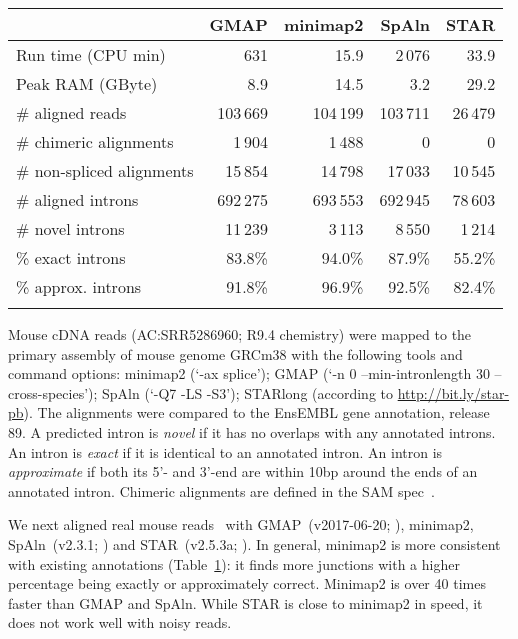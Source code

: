 \documentclass{bioinfo}
\begin{document}
\begin{table}[!tb]
{\footnotesize\label{tab:intron}
\begin{tabular}{p{3.1cm}rrrr}
\toprule
& GMAP & minimap2 & SpAln & STAR\\
\midrule
Run time (CPU min)        & 631      & 15.9     & 2\,076   & 33.9 \\
Peak RAM (GByte)          & 8.9      & 14.5     & 3.2      & 29.2\vspace{1em}\\
\# aligned reads          & 103\,669 & 104\,199 & 103\,711 & 26\,479 \\
\# chimeric alignments    & 1\,904   & 1\,488   & 0        & 0 \\
\# non-spliced alignments & 15\,854  & 14\,798  & 17\,033  & 10\,545\vspace{1em}\\
\# aligned introns        & 692\,275 & 693\,553 & 692\,945 & 78\,603 \\
\# novel introns          & 11\,239  & 3\,113   & 8\,550   & 1\,214 \\
\% exact introns          & 83.8\%   & 94.0\%   & 87.9\%   & 55.2\% \\
\% approx. introns        & 91.8\%   & 96.9\%   & 92.5\%   & 82.4\% \\
\botrule
\end{tabular}
}{Mouse cDNA reads (AC:SRR5286960; R9.4 chemistry) were mapped to the primary assembly of mouse
genome GRCm38 with the following tools and command options: minimap2 (`-ax
splice'); GMAP (`-n 0 --min-intronlength 30 --cross-species'); SpAln (`-Q7 -LS
-S3'); STARlong (according to
\href{http://bit.ly/star-pb}{http://bit.ly/star-pb}). The alignments were
compared to the EnsEMBL gene annotation, release 89. A predicted intron
is \emph{novel} if it has no overlaps with any annotated introns. An intron
is \emph{exact} if it is identical to an annotated intron. An intron is
\emph{approximate} if both its 5'- and 3'-end are within 10bp around the ends
of an annotated intron. Chimeric alignments are defined in the SAM spec~\citep{Li:2009ys}.}
\end{table}

We next aligned real mouse reads~\citep{Byrne:2017aa} with GMAP~(v2017-06-20;
\citealp{Wu:2005vn}), minimap2, SpAln~(v2.3.1; \citealp{Iwata:2012aa}) and
STAR~(v2.5.3a; \citealp{Dobin:2013kx}). In general, minimap2 is more
consistent with existing annotations (Table~\ref{tab:intron}): it finds
more junctions with a higher percentage being exactly or approximately correct.
Minimap2 is over 40 times faster than GMAP and SpAln. While STAR is close to
minimap2 in speed, it does not work well with noisy reads.
\end{document}
